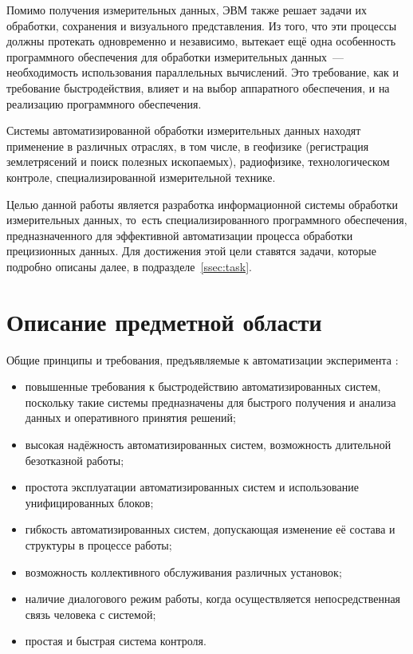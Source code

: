 \documentclass[a4paper, 14pt]{extarticle}
\begin{document}
  Помимо получения измерительных данных, ЭВМ также решает задачи их обработки, сохранения и
  визуального представления. Из того, что эти процессы должны протекать одновременно и независимо,
  вытекает ещё одна особенность программного обеспечения для обработки измерительных данных~---
  необходимость использования параллельных вычислений. Это требование, как и требование
  быстродействия, влияет и на выбор аппаратного обеспечения, и на реализацию программного обеспечения.

  Системы автоматизированной обработки измерительных данных находят применение в различных отраслях,
  в том числе, в геофизике (регистрация землетрясений и поиск полезных ископаемых), радиофизике,
  технологическом контроле, специализированной измерительной технике.

  Целью данной работы является разработка информационной системы обработки измерительных данных,
  то~есть специализированного программного обеспечения, предназначенного для эффективной
  автоматизации процесса обработки прецизионных данных. Для достижения этой цели ставятся задачи,
  которые подробно описаны далее, в подразделе~\ref{ssec:task}.

  \section{Описание предметной области}

  Общие принципы и требования, предъявляемые к автоматизации эксперимента \cite{vinogradov-discrete, kurochkin-kamak}:
  \begin{itemize}
    \item повышенные требования к быстродействию автоматизированных систем, поскольку такие системы
      предназначены для быстрого получения и анализа данных и оперативного принятия решений;
    \item высокая надёжность автоматизированных систем, возможность длительной безотказной работы;
    \item простота эксплуатации автоматизированных систем и использование унифицированных блоков;
    \item гибкость автоматизированных систем, допускающая изменение её состава и структуры в процессе работы;
    \item возможность коллективного обслуживания различных установок;
    \item наличие диалогового режим работы, когда осуществляется непосредственная связь человека с системой;
    \item простая и быстрая система контроля.
  \end{itemize}
\end{document}
